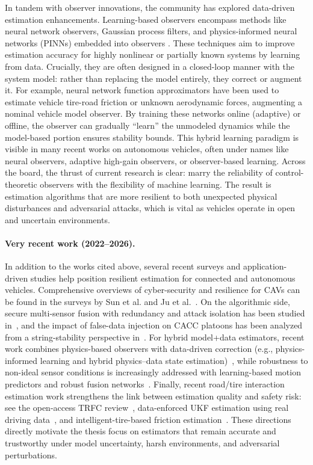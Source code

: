 In tandem with observer innovations, the community has explored data-driven estimation enhancements. Learning-based observers encompass methods like neural network observers, Gaussian process filters, and physics-informed neural networks (PINNs) embedded into observers \cite{Farkane_2025}. These techniques aim to improve estimation accuracy for highly nonlinear or partially known systems by learning from data. Crucially, they are often designed in a closed-loop manner with the system model: rather than replacing the model entirely, they correct or augment it. For example, neural network function approximators have been used to estimate vehicle tire-road friction or unknown aerodynamic forces, augmenting a nominal vehicle model observer. By training these networks online (adaptive) or offline, the observer can gradually “learn” the unmodeled dynamics while the model-based portion ensures stability bounds. This hybrid learning paradigm is visible in many recent works on autonomous vehicles, often under names like neural observers, adaptive high-gain observers, or observer-based learning. Across the board, the thrust of current research is clear: marry the reliability of control-theoretic observers with the flexibility of machine learning. The result is estimation algorithms that are more resilient to both unexpected physical disturbances and adversarial attacks, which is vital as vehicles operate in open and uncertain environments.

\paragraph{Very recent work (2022--2026).}
In addition to the works cited above, several recent surveys and application-driven studies help position resilient estimation for connected and autonomous vehicles. Comprehensive overviews of cyber-security and resilience for CAVs can be found in the surveys by Sun et al. and Ju et al.~\cite{Sun2022CyberSecurityCAVSurvey,Ju2022AttackDetectionResilienceSurvey}. 
On the algorithmic side, secure multi-sensor fusion with redundancy and attack isolation has been studied 
in~\cite{YangLv2022SecureSensorFusion}, 
and the impact of false-data injection on CACC platoons has been analyzed from a 
string-stability perspective in~\cite{Biroon2022FDICACCPlatoon}. 
For hybrid model+data estimators, recent work combines physics-based observers with data-driven correction (e.g., physics-informed learning and hybrid physics--data state estimation)~\cite{Tan2023PINNUKFManifolds,Li2025HybridPhysicsDataVehicleSE}, 
while robustness to non-ideal sensor conditions is increasingly addressed with learning-based motion predictors and robust fusion networks~\cite{Dahal2024RobustStateNet}. Finally, recent road/tire interaction estimation work strengthens the link between estimation quality and safety risk: see the open-access TRFC review~\cite{Wang2022TRFCReview}, data-enforced UKF estimation using real driving data~\cite{Han2025DataEnforcedUKFTRFC}, and intelligent-tire-based friction estimation~\cite{Gu2025IntelligentTireTRFC}. These directions directly motivate the thesis focus on estimators that remain accurate and trustworthy under model uncertainty, harsh environments, and adversarial perturbations.



